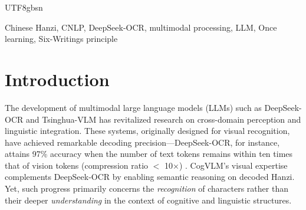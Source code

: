 \documentclass[conference]{IEEEtran}
\begin{document}
\begin{CJK*}{UTF8}{gbsn}


\begin{IEEEkeywords}
Chinese Hanzi, CNLP, DeepSeek-OCR, multimodal processing, LLM, Once learning, Six-Writings principle
\end{IEEEkeywords}

\section{Introduction}
The development of multimodal large language models (LLMs) such as DeepSeek-OCR \cite{wei2025deepseek} and Tsinghua-VLM \cite{wang2024cogvlm} has revitalized research on cross-domain perception and linguistic integration. These systems, originally designed for visual recognition, have achieved remarkable decoding precision—DeepSeek-OCR, for instance, attains 97\% accuracy when the number of text tokens remains within ten times that of vision tokens (compression ratio $<$ 10×) \cite{wei2025deepseek}. CogVLM's visual expertise complements DeepSeek-OCR by enabling semantic reasoning on decoded Hanzi. Yet, such progress primarily concerns the \textit{recognition} of characters rather than their deeper \textit{understanding} in the context of cognitive and linguistic structures.


\end{CJK*}
\end{document}
